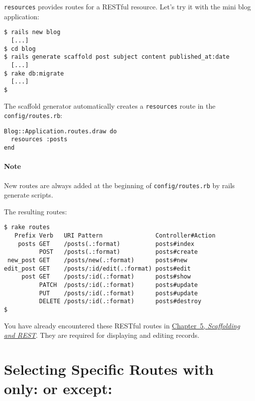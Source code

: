 \documentclass[a4paper]{book}
\begin{document}
\texttt{resources} provides routes for a RESTful resource. Let's try it with the mini blog application:

\begin{shaded}\begin{verbatim}
$ rails new blog
  [...]
$ cd blog
$ rails generate scaffold post subject content published_at:date
  [...]
$ rake db:migrate
  [...]
$
\end{verbatim}\end{shaded}

The scaffold generator automatically creates a \texttt{resources} route in the \texttt{config/routes.rb}:

\begin{shaded}\begin{verbatim}
Blog::Application.routes.draw do
  resources :posts
end
\end{verbatim}\end{shaded}

\paragraph{Note}\label{note-37}

New routes are always added at the beginning of \texttt{config/routes.rb} by rails generate scripts.

The resulting routes:

\begin{shaded}\begin{verbatim}
$ rake routes
   Prefix Verb   URI Pattern               Controller#Action
    posts GET    /posts(.:format)          posts#index
          POST   /posts(.:format)          posts#create
 new_post GET    /posts/new(.:format)      posts#new
edit_post GET    /posts/:id/edit(.:format) posts#edit
     post GET    /posts/:id(.:format)      posts#show
          PATCH  /posts/:id(.:format)      posts#update
          PUT    /posts/:id(.:format)      posts#update
          DELETE /posts/:id(.:format)      posts#destroy
$
\end{verbatim}\end{shaded}

You have already encountered these RESTful routes in \hyperref[scaffolding]{Chapter~5, \emph{Scaffolding and REST}}. They are required for displaying and editing records.

\section{Selecting Specific Routes with only: or except:}\label{selecting-specific-routes-with-only-or-except}
\end{document}
